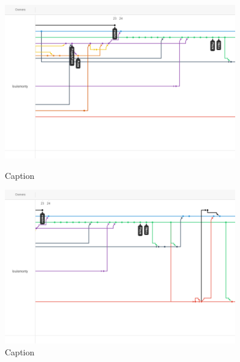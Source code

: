 \begin{figure}
    \includegraphics[width=0.9\textwidth]{Report/root/11.png}
    \caption{Caption}
    \includegraphics[width=0.9\textwidth]{Report/root/12.png}
    \caption{Caption}
    \label{endOfDoc}
    \end{figure}
    


    